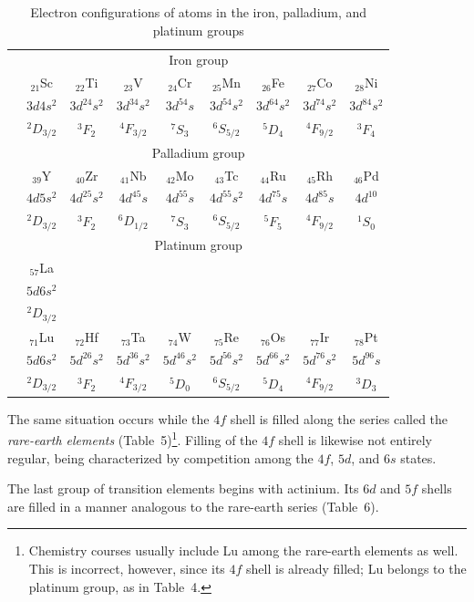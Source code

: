 \begin{table}[ht]
\centering\scriptsize
\caption{Electron configurations of atoms in the iron, palladium, and platinum groups}
\begin{tabular}{c|cccccccc}
\multicolumn{9}{c}{Iron group}\\
&$_{21}$Sc&$_{22}$Ti&$_{23}$V&$_{24}$Cr&$_{25}$Mn&$_{26}$Fe&$_{27}$Co&$_{28}$Ni\\
&$3d4s^2$&$3d^24s^2$&$3d^34s^2$&$3d^54s$&$3d^54s^2$&$3d^64s^2$&$3d^74s^2$&$3d^84s^2$\\
&$^2D_{3/2}$&$^3F_2$&$^4F_{3/2}$&$^7S_3$&$^6S_{5/2}$&$^5D_4$&$^4F_{9/2}$&$^3F_4$\\\hline
\multicolumn{9}{c}{Palladium group}\\
&$_{39}$Y&$_{40}$Zr&$_{41}$Nb&$_{42}$Mo&$_{43}$Tc&$_{44}$Ru&$_{45}$Rh&$_{46}$Pd\\
&$4d5s^2$&$4d^25s^2$&$4d^45s$&$4d^55s$&$4d^55s^2$&$4d^75s$&$4d^85s$&$4d^{10}$\\
&$^2D_{3/2}$&$^3F_2$&$^6D_{1/2}$&$^7S_3$&$^6S_{5/2}$&$^5F_5$&$^4F_{9/2}$&$^1S_0$\\\hline
\multicolumn{9}{c}{Platinum group}\\
&$_{57}$La&&&&&&&\\
&$5d6s^2$&&&&&&&\\
&$^2D_{3/2}$&&&&&&&\\
&$_{71}$Lu&$_{72}$Hf&$_{73}$Ta&$_{74}$W&$_{75}$Re&$_{76}$Os&$_{77}$Ir&$_{78}$Pt\\
&$5d6s^2$&$5d^26s^2$&$5d^36s^2$&$5d^46s^2$&$5d^56s^2$&$5d^66s^2$&$5d^76s^2$&$5d^96s$\\
&$^2D_{3/2}$&$^3F_2$&$^4F_{3/2}$&$^5D_0$&$^6S_{5/2}$&$^5D_4$&$^4F_{9/2}$&$^3D_3$
\end{tabular}
\end{table}

The same situation occurs while the $4f$ shell is filled along the series called the \emph{rare-earth elements} (Table~5)\footnote{Chemistry courses usually include Lu among the rare-earth elements as well. This is incorrect, however, since its $4f$ shell is already filled; Lu belongs to the platinum group, as in Table~4.}. Filling of the $4f$ shell is likewise not entirely regular, being characterized by competition among the $4f$, $5d$, and $6s$ states.

The last group of transition elements begins with actinium. Its $6d$ and $5f$ shells are filled in a manner analogous to the rare-earth series (Table~6).

